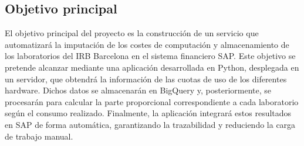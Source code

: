 \subsection{Objetivo principal}
El objetivo principal del proyecto es la construcción de un servicio que automatizará la imputación de los costes de computación y 
almacenamiento de los laboratorios del IRB Barcelona en el sistema financiero SAP. Este objetivo se pretende alcanzar mediante una 
aplicación desarrollada en Python, desplegada en un servidor, que obtendrá la información de las cuotas de uso de los diferentes hardware. 
Dichos datos se almacenarán en BigQuery y, posteriormente, se procesarán para calcular la parte proporcional correspondiente a cada laboratorio según el consumo realizado. 
Finalmente, la aplicación integrará estos resultados en SAP de forma automática, garantizando la trazabilidad y reduciendo la carga de trabajo manual.